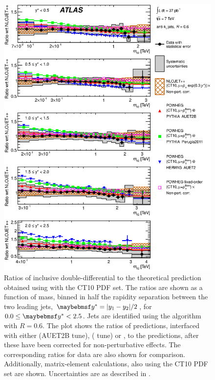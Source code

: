 \begin{figure}
  \includegraphics[width=\largefigwidth]{chapters/dijets/DijetMassYStarRatioFinal06_central.eps}
  \caption{Ratios of inclusive \dijet double-differential \xs to the theoretical
     prediction obtained using \NLOjetpp with the CT10 PDF set. The ratios
     are shown as a function of \dijet mass, binned in half the rapidity separation
     between the two leading jets, $\yStar = |y_1 - y_2|/2$, for $0.0 \leq \yStar < 2.5$.
     Jets are identified using the \akt algorithm with $R=0.6$. The plot shows the
     ratios of \Powheg predictions, interfaced with either \Pythia (AUET2B tune), \Pythia
     ( tune) or \Herwig, to the \NLOjetpp predictions, after these have
     been corrected for non-perturbative effects. The corresponding ratios for data
     are also shown for comparison. Additionally, \Powheg matrix-element calculations,
     also using the CT10 PDF set are shown. Uncertainties are as described in
     .}
  \label{fig:dijets:PowhegRatio_akt6_central}
\end{figure}

